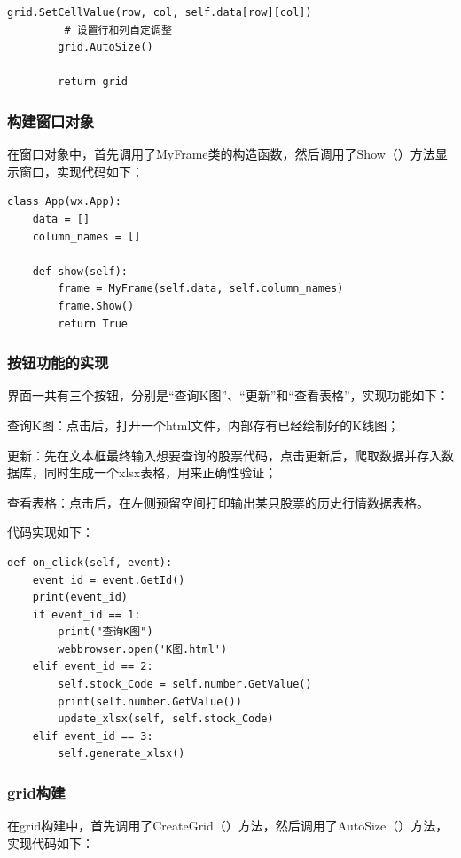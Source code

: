 \documentclass[UTF8,12pt]{article}
\begin{document}
\newpage

\begin{lstlisting}[title=MyFrame的构建,frame=shadowbox]
                grid.SetCellValue(row, col, self.data[row][col])
         # 设置行和列自定调整
        grid.AutoSize()

        return grid
\end{lstlisting}

\subsubsection{构建窗口对象}
在窗口对象中，首先调用了MyFrame类的构造函数，然后调用了Show（）方法显示窗口，实现代码如下：

\begin{lstlisting}[title=构建窗口对象,frame=shadowbox]
class App(wx.App):
    data = []
    column_names = []

    def show(self):
        frame = MyFrame(self.data, self.column_names)
        frame.Show()
        return True
\end{lstlisting}

\subsubsection{按钮功能的实现}
界面一共有三个按钮，分别是“查询K图”、“更新”和“查看表格”，实现功能如下：

查询K图：点击后，打开一个html文件，内部存有已经绘制好的K线图；

更新：先在文本框最终输入想要查询的股票代码，点击更新后，爬取数据并存入数据库，同时生成一个xlsx表格，用来正确性验证；

查看表格：点击后，在左侧预留空间打印输出某只股票的历史行情数据表格。

代码实现如下：
\begin{lstlisting}[title=按钮功能实现,frame=shadowbox]
def on_click(self, event):
    event_id = event.GetId()
    print(event_id)
    if event_id == 1:
        print("查询K图")
        webbrowser.open('K图.html')
    elif event_id == 2:
        self.stock_Code = self.number.GetValue()
        print(self.number.GetValue())
        update_xlsx(self, self.stock_Code)
    elif event_id == 3:
        self.generate_xlsx()
\end{lstlisting}

\subsubsection{grid构建}
在grid构建中，首先调用了CreateGrid（）方法，然后调用了AutoSize（）方法，实现代码如下：
\end{document}
